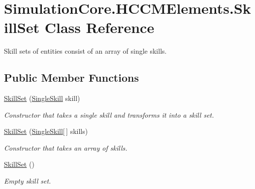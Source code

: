 \hypertarget{class_simulation_core_1_1_h_c_c_m_elements_1_1_skill_set}{}\section{Simulation\+Core.\+H\+C\+C\+M\+Elements.\+Skill\+Set Class Reference}
\label{class_simulation_core_1_1_h_c_c_m_elements_1_1_skill_set}


Skill sets of entities consist of an array of single skills.  


\subsection*{Public Member Functions}
\begin{DoxyCompactItemize}
\item 
\hyperlink{class_simulation_core_1_1_h_c_c_m_elements_1_1_skill_set_a577196c17baf7c295f7fb2d56d9781dc}{Skill\+Set} (\hyperlink{class_simulation_core_1_1_h_c_c_m_elements_1_1_single_skill}{Single\+Skill} skill)
\begin{DoxyCompactList}\small\item\em Constructor that takes a single skill and transforms it into a skill set. \end{DoxyCompactList}\item 
\hyperlink{class_simulation_core_1_1_h_c_c_m_elements_1_1_skill_set_abd0b280c548cfaa94272bbbae7b8c969}{Skill\+Set} (\hyperlink{class_simulation_core_1_1_h_c_c_m_elements_1_1_single_skill}{Single\+Skill}\mbox{[}$\,$\mbox{]} skills)
\begin{DoxyCompactList}\small\item\em Constructor that takes an array of skills. \end{DoxyCompactList}\item 
\hyperlink{class_simulation_core_1_1_h_c_c_m_elements_1_1_skill_set_a0551da123b938077e6750b1be9269fea}{Skill\+Set} ()
\begin{DoxyCompactList}\small\item\em Empty skill set. \end{DoxyCompactList}\end{DoxyCompactItemize}
